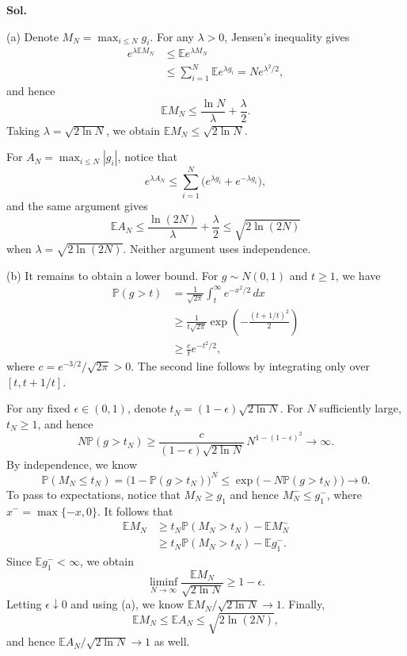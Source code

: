\documentclass[lang=en,11pt,a4paper,citestyle=authoryear,nobib=true]{elegantpaper}
\newcommand{\E}{\mathbb{E}}
\renewcommand{\P}{\mathbb{P}}
\begin{document}
\par\vspace{0.5em}\noindent\textbf{Sol.}\par
(a) Denote $M_N=\max_{i\le N}g_i$. For any $\lambda>0$, Jensen's
inequality gives
\[
\begin{aligned}
e^{\lambda\E M_N}
&\le\E e^{\lambda M_N}\\
&\le\sum_{i=1}^N\E e^{\lambda g_i}
=Ne^{\lambda^2/2},
\end{aligned}
\]
and hence
\[
\E M_N\le\frac{\ln N}{\lambda}+\frac{\lambda}{2}.
\]
Taking $\lambda=\sqrt{2\ln N}$, we obtain
$\E M_N\le\sqrt{2\ln N}$.

For $A_N=\max_{i\le N}|g_i|$, notice that
\[
e^{\lambda A_N}
\le\sum_{i=1}^N\bigl(e^{\lambda g_i}+e^{-\lambda g_i}\bigr),
\]
and the same argument gives
\[
\E A_N\le\frac{\ln(2N)}{\lambda}+\frac{\lambda}{2}
\le\sqrt{2\ln(2N)}
\]
when $\lambda=\sqrt{2\ln(2N)}$. Neither argument uses independence.

\noindent (b) It remains to obtain a lower bound. For $g\sim N(0,1)$ and
$t\ge1$, we have
\[
\begin{aligned}
\P(g>t)
&=\frac1{\sqrt{2\pi}}\int_t^\infty e^{-x^2/2}\,dx\\
&\ge\frac1{t\sqrt{2\pi}}
\exp\left(-\frac{(t+1/t)^2}{2}\right)\\
&\ge\frac{c}{t}e^{-t^2/2},
\end{aligned}
\]
where $c=e^{-3/2}/\sqrt{2\pi}>0$. The second line follows by integrating
only over $[t,t+1/t]$.

For any fixed $\epsilon\in(0,1)$, denote
$t_N=(1-\epsilon)\sqrt{2\ln N}$. For $N$ sufficiently large, $t_N\ge1$,
and hence
\[
N\P(g>t_N)
\ge\frac{c}{(1-\epsilon)\sqrt{2\ln N}}\,
N^{1-(1-\epsilon)^2}\longrightarrow\infty.
\]
By independence, we know
\[
\P(M_N\le t_N)
=\bigl(1-\P(g>t_N)\bigr)^N
\le\exp\bigl(-N\P(g>t_N)\bigr)\longrightarrow0.
\]
To pass to expectations, notice that $M_N\ge g_1$ and hence
$M_N^-\le g_1^-$, where $x^-=\max\{-x,0\}$. It follows that
\[
\begin{aligned}
\E M_N
&\ge t_N\P(M_N>t_N)-\E M_N^-\\
&\ge t_N\P(M_N>t_N)-\E g_1^-.
\end{aligned}
\]
Since $\E g_1^-<\infty$, we obtain
\[
\liminf_{N\to\infty}\frac{\E M_N}{\sqrt{2\ln N}}\ge1-\epsilon.
\]
Letting $\epsilon\downarrow0$ and using (a), we know
$\E M_N/\sqrt{2\ln N}\to1$. Finally,
\[
\E M_N\le\E A_N\le\sqrt{2\ln(2N)},
\]
and hence $\E A_N/\sqrt{2\ln N}\to1$ as well.

\newpage
\end{document}
